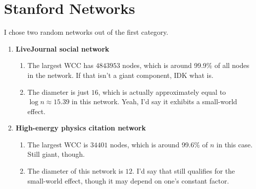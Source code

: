 \documentclass[12pt]{article}
\begin{document}
\section{Stanford Networks}

I chose two random networks out of the first category.
\begin{enumerate}[label=\arabic*.]
      \item \textbf{LiveJournal social network}
            \begin{enumerate}
                  \item The largest WCC has $4843953$ nodes, which is around 99.9\% of all nodes in the network.
                        If that isn't a giant component, IDK what is.
                  \item The diameter is just $16$, which is actually approximately
                        equal to $\log n \approx 15.39$ in this network.
                        Yeah, I'd say it exhibits a small-world effect.
            \end{enumerate}
      \item \textbf{High-energy physics citation network}
            \begin{enumerate}
                  \item The largest WCC is $34401$ nodes, which is around 99.6\% of $n$ in this case.
                        Still giant, though.
                  \item The diameter of this network is $12$.
                        I'd say that still qualifies for the small-world effect,
                        though it may depend on one's constant factor.
            \end{enumerate}
\end{enumerate}
\end{document}
